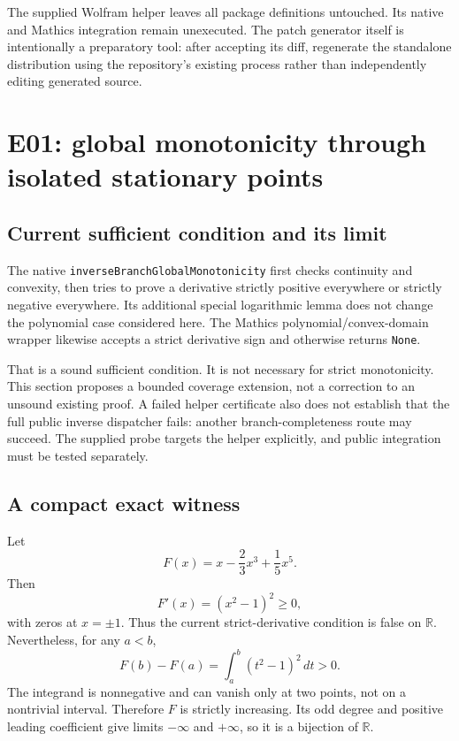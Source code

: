 \documentclass[11pt,letterpaper]{article}
\newcommand{\code}[1]{\nolinkurl{#1}}
\newcommand{\R}{\mathbb R}
\begin{document}
The supplied Wolfram helper leaves all package definitions untouched. Its native and Mathics integration remain unexecuted. The patch generator itself is intentionally a preparatory tool: after accepting its diff, regenerate the standalone distribution using the repository's existing process rather than independently editing generated source.

\section{E01: global monotonicity through isolated stationary points}
\label{sec:monotonicity}

\subsection{Current sufficient condition and its limit}
The native \code{inverseBranchGlobalMonotonicity} first checks continuity and convexity, then tries to prove a derivative strictly positive everywhere or strictly negative everywhere. Its additional special logarithmic lemma does not change the polynomial case considered here. The Mathics polynomial/convex-domain wrapper likewise accepts a strict derivative sign and otherwise returns \code{None}.\cite{branches,mathicsbranches}

That is a sound sufficient condition. It is not necessary for strict monotonicity. This section proposes a bounded coverage extension, not a correction to an unsound existing proof. A failed helper certificate also does not establish that the full public inverse dispatcher fails: another branch-completeness route may succeed. The supplied probe targets the helper explicitly, and public integration must be tested separately.

\subsection{A compact exact witness}
Let
\begin{equation}
 F(x)=x-\frac23x^3+\frac15x^5.
 \label{eq:quintic}
\end{equation}
Then
\[
 F'(x)=(x^2-1)^2\ge0,
\]
with zeros at \(x=\pm1\). Thus the current strict-derivative condition is false on \(\R\). Nevertheless, for any \(a<b\),
\[
 F(b)-F(a)=\int_a^b(t^2-1)^2\,dt>0.
\]
The integrand is nonnegative and can vanish only at two points, not on a nontrivial interval. Therefore \(F\) is strictly increasing. Its odd degree and positive leading coefficient give limits \(-\infty\) and \(+\infty\), so it is a bijection of \(\R\).
\end{document}
